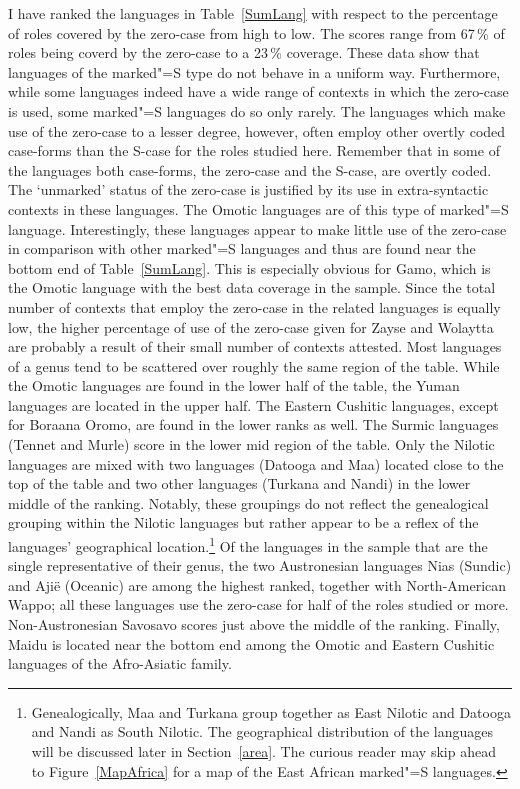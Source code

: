 I have ranked the languages in Table~\vref{SumLang} with respect to the percentage of roles covered by the zero-case from high to low.
The scores range from 67\,\% of roles being coverd by the zero-case to a 23\,\% coverage. 
These data show that languages of the marked"=S type do not behave in a uniform way. 
Furthermore, while some languages indeed have a wide range of contexts in which the zero-case is used, some marked"=S languages do so only rarely.
The languages which make use of the zero-case to a lesser degree, however, often employ other overtly coded case-forms than the S-case for the roles studied here.  
Remember that in some of the languages both case-forms, the zero-case and the S-case, are overtly coded. 
The `unmarked' status of the zero-case is justified by its use in extra-syntactic contexts in these languages. 
The Omotic languages are of this type of marked"=S language. 
Interestingly, these languages appear to make little use of the zero-case in comparison with other marked"=S languages and thus are found near the bottom end of Table~\ref{SumLang}. This is especially obvious for Gamo, which is the Omotic language with the best data coverage in the sample. 
Since the total number of contexts that employ the zero-case in the related languages is equally low, the higher percentage of use of the zero-case given for Zayse and Wolaytta are probably a result of their small number of contexts attested.  
Most languages of a genus tend to be scattered over roughly the same region of the table. 
While the Omotic languages are found in the lower half of the table, the Yuman languages are located in the upper half. 
The Eastern Cushitic languages, except for Boraana Oromo, are found in the lower ranks as well. 
The Surmic languages (Tennet and Murle) score in the lower mid region of the table. 
Only the Nilotic languages are mixed with two languages (Datooga and Maa) located close to the top of the table and two other languages (Turkana and Nandi) in the lower middle of the ranking. 
Notably, these groupings do not reflect the genealogical grouping within the Nilotic languages but rather appear to be a reflex of the languages' geographical location.\footnote{Genealogically, Maa and Turkana group together as East Nilotic and Datooga and Nandi as South Nilotic. The geographical distribution of the languages will be discussed later in Section~\ref{area}. The curious reader may skip ahead to Figure~\ref{MapAfrica} for a map of the East African marked"=S languages.}  
Of the languages in the sample that are the single representative of their genus, the two Austronesian languages Nias (Sundic) and Aji\"e (Oceanic) are among the highest ranked, together with North-American Wappo; all these languages use the zero-case for half of the roles studied or more. 
Non-Austronesian Savosavo scores just above the middle of the ranking. 
Finally, Maidu is located near the bottom end among the Omotic and Eastern Cushitic languages of the Afro-Asiatic family.

